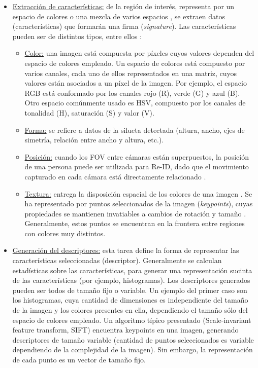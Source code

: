 \documentclass[../memoria.tex]{subfiles}
\begin{document}
\begin{itemize}
	\item \underline{Extracción de características:} de la región de interés, representa por un espacio de colores o una mezcla de varios espacios \cite{gray2008viewpoint}, se extraen datos (características) que formarán una firma (\emph{signature}). Las características pueden ser de distintos tipos, entre ellos \cite{vezzani2013people}: 
		\begin{itemize}
			\item \underline{Color:} una imagen está compuesta por píxeles cuyos valores dependen del espacio de colores empleado. Un espacio de colores está compuesto por varios canales, cada uno de ellos representados en una matriz, cuyos valores están asociados a un píxel de la imagen. Por ejemplo, el espacio RGB está conformado por los canales rojo (R), verde (G) y azul (B). Otro espacio comúnmente usado es HSV, compuesto por los canales de tonalidad (H), saturación (S) y valor (V). %
			
			\item \underline{Forma:} se refiere a datos de la silueta detectada (altura, ancho, ejes de simetría, relación entre ancho y altura, etc.). 
			
			\item \underline{Posición:} cuando los FOV entre cámaras están superpuestos, la posición de una persona puede ser utilizada para Re-ID, dado que el movimiento capturado en cada cámara está directamente relacionado \cite{khan2003consistent, calderara2008hecol}.
			
			\item \underline{Textura:} entrega la disposición espacial de los colores de una imagen \cite{stockman2001computervision}. Se ha representado por puntos seleccionados de la imagen (\emph{keypoints}), cuyas propiedades se mantienen invatiables a cambios de rotación y tamaño \cite{lowe1999object, bay2006surf}. Generalmente, estos puntos se encuentran en la frontera entre regiones con colores muy distintos.
		\end{itemize}

	\item \underline{Generación del descriptores:} esta tarea define la forma de representar las características seleccionadas (descriptor). Generalmente se calculan estadísticas sobre las características, para generar una representación sucinta de las características (por ejemplo, histogramas). Los descriptores generados pueden ser todos de tamaño fijo o variable. Un ejemplo del primer caso son los histogramas, cuya cantidad de dimensiones es independiente del tamaño de la imagen y los colores presentes en ella, dependiendo el tamaño sólo del espacio de colores empleado. Un algoritmo típico presentado \cite{lowe1999object} (Scale-invariant feature transform, SIFT) encuentra keypoints en una imagen, generando descriptores de tamaño variable (cantidad de puntos seleccionados es variable dependiendo de la complejidad de la imagen). Sin embargo, la representación de cada punto es un vector de tamaño fijo.


\end{itemize}
\end{document}
